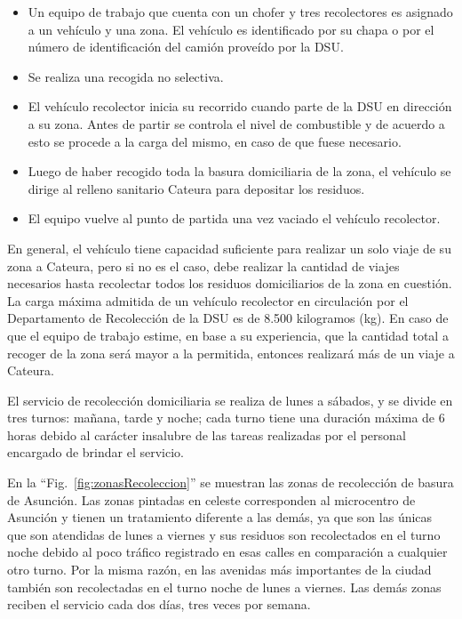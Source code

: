 \documentclass[conference,compsoc]{IEEEtran}
\begin{document}
\begin{itemize}
\item Un equipo de trabajo que cuenta con un chofer y tres recolectores es asignado a un vehículo y una zona. El vehículo es identificado por su chapa o por el número de identificación del camión proveído por la DSU.
\item Se realiza una recogida no selectiva.
\item El vehículo recolector inicia su recorrido cuando parte de la DSU en dirección a su zona. Antes de partir se controla el nivel de combustible y de acuerdo a esto se procede a la carga del mismo, en caso de que fuese necesario.
\item Luego de haber recogido toda la basura domiciliaria de la zona, el vehículo se dirige al relleno sanitario Cateura para depositar los residuos.
\item El equipo vuelve al punto de partida una vez vaciado el vehículo recolector.  
\end{itemize}

En general, el vehículo tiene capacidad suficiente para realizar un solo viaje de su zona a Cateura, pero si no es el caso, debe realizar la cantidad de viajes necesarios hasta recolectar todos los residuos domiciliarios de la zona en cuestión. La carga máxima admitida de un vehículo recolector en circulación por el Departamento de Recolección de la DSU es de 8.500 kilogramos (kg). En caso de que el equipo de trabajo estime, en base a su experiencia, que la cantidad total a recoger de la zona será mayor a la permitida, entonces realizará más de un viaje a Cateura.

El servicio de recolección domiciliaria se realiza de lunes a sábados, y se divide en tres turnos: mañana, tarde y noche; cada turno tiene una duración máxima de 6 horas debido al carácter insalubre de las tareas realizadas por el personal encargado de brindar el servicio.

En la ``Fig.~\ref{fig:zonasRecoleccion}'' se muestran las zonas de recolección de basura de Asunción. Las zonas pintadas en celeste corresponden al microcentro de Asunción y tienen un tratamiento diferente a las demás, ya que son las únicas que son atendidas de lunes a viernes y sus residuos son recolectados en el turno noche debido al poco tráfico registrado en esas calles en comparación a cualquier otro turno. Por la misma razón, en las avenidas más importantes de la ciudad también son recolectadas en el turno noche de lunes a viernes. Las demás zonas reciben el servicio cada dos días, tres veces por semana.
\end{document}
